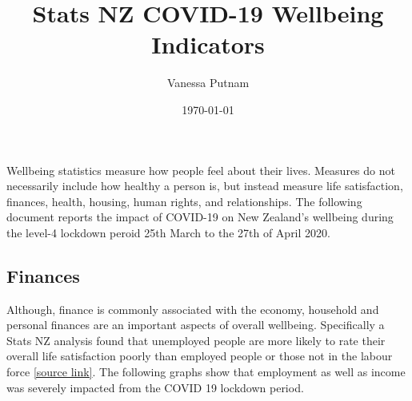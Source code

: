 \documentclass{article}
\title{Stats NZ COVID-19 Wellbeing Indicators }
\author{Vanessa Putnam}
\date{\today}
\begin{document}
\maketitle

Wellbeing statistics measure how people feel about their lives. Measures do not necessarily include how healthy a person is, but instead measure life satisfaction, finances, health, housing, human rights, and relationships. The following document reports the impact of COVID-19 on New Zealand's wellbeing during the level-4 lockdown peroid 25th March to the 27th of April 2020.

\subsection*{Finances}
Although, finance is commonly associated with the economy, household and personal finances are an important aspects of overall wellbeing. Specifically a Stats NZ analysis found that unemployed people are more likely to rate their overall life satisfaction poorly than employed people or those not in the labour force \href{https://www.stats.govt.nz/news/unemployed-people-less-satisfied-with-life}{[source link]}. The following graphs show that employment as well as income was severely impacted from the COVID 19 lockdown period. 
\end{document}
